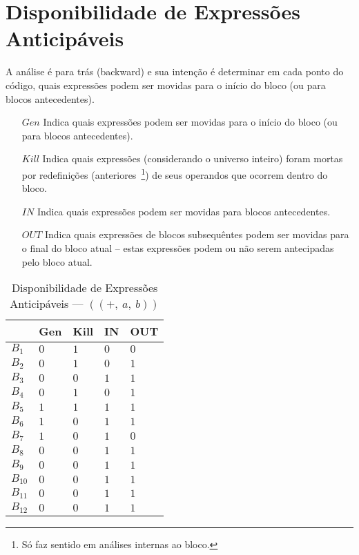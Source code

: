 \section{Disponibilidade de Express\~oes Anticip\'aveis}

A an\'alise \'e para tr\'as (\textsf{backward}) e sua inten\c{c}\~ao \'e determinar em cada ponto do c\'odigo, quais express\~oes podem ser movidas para o in\'icio do bloco (ou para blocos antecedentes).
\begin{itemize}
  \item[$Gen$] Indica quais express\~oes podem ser movidas para o in\'icio do bloco (ou para blocos antecedentes).
  \item[$Kill$] Indica quais express\~oes (considerando o universo inteiro) foram mortas por redefini\c{c}\~oes (anteriores~\footnote{S\'o faz sentido em an\'alises internas ao bloco.}) de seus operandos que ocorrem dentro do bloco.
  \item[$IN$] Indica quais express\~oes podem ser movidas para blocos antecedentes.
  \item[$OUT$] Indica quais express\~oes de blocos subsequ\^entes podem ser movidas para o final do bloco atual -- estas express\~oes podem ou n\~ao serem antecipadas pelo bloco atual.
\end{itemize}

\begin{table}[ht]
\centering
\begin{tabular}{l|l|l|l|l}
	& Gen & Kill & IN & OUT\\
\hline
$B_{1}$ &  $0$ & $1$ & $0$ & $0$\\
$B_{2}$ &  $0$ & $1$ & $0$ & $1$\\
$B_{3}$ &  $0$ & $0$ & $1$ & $1$\\
$B_{4}$ &  $0$ & $1$ & $0$ & $1$\\
$B_{5}$ &  $1$ & $1$ & $1$ & $1$\\
$B_{6}$ &  $1$ & $0$ & $1$ & $1$\\
$B_{7}$ &  $1$ & $0$ & $1$ & $0$\\
$B_{8}$ &  $0$ & $0$ & $1$ & $1$\\
$B_{9}$ &  $0$ & $0$ & $1$ & $1$\\
$B_{10}$ &  $0$ & $0$ & $1$ & $1$\\
$B_{11}$ &  $0$ & $0$ & $1$ & $1$\\
$B_{12}$ &  $0$ & $0$ & $1$ & $1$\\
\end{tabular}
\caption{Disponibilidade de Express\~oes Anticip\'aveis --- $((+,\:a,\:b))$}
\end{table}

